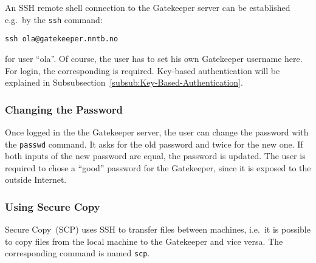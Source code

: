 An SSH remote shell connection to the Gatekeeper server can be established e.g.\ by the \texttt{ssh} command:
\begin{lstlisting}
ssh ola@gatekeeper.nntb.no
\end{lstlisting}
for user ``ola''. Of course, the user has to set his own Gatekeeper username here. For login, the corresponding  is required. Key-based authentication will be explained in Subsubsection~\ref{subsub:Key-Based-Authentication}.


\subsubsection{Changing the Password}

Once logged in the the Gatekeeper server, the user can change the password with the \texttt{passwd} command. It asks for the old password and twice for the new one. If both inputs of the new password are equal, the password is updated. The user is required to chose a ``good'' password for the Gatekeeper, since it is exposed to the outside Internet.


\subsubsection{Using Secure Copy}

Secure Copy~(SCP) uses SSH to transfer files between machines, i.e.\ it is possible to copy files from the local machine to the Gatekeeper and vice versa. The corresponding command is named \texttt{scp}.

